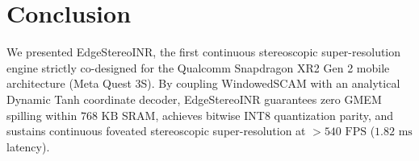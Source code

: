 \documentclass[10pt,journal,compsoc]{IEEEtran}
\begin{document}
\section{Conclusion}
We presented EdgeStereoINR, the first continuous stereoscopic super-resolution engine strictly co-designed for the Qualcomm Snapdragon XR2 Gen 2 mobile architecture (Meta Quest 3S). By coupling WindowedSCAM with an analytical Dynamic Tanh coordinate decoder, EdgeStereoINR guarantees zero GMEM spilling within $768\text{ KB}$ SRAM, achieves bitwise INT8 quantization parity, and sustains continuous foveated stereoscopic super-resolution at $>540\text{ FPS}$ ($1.82\text{ ms}$ latency).



\end{document}
